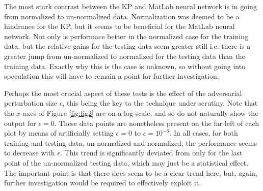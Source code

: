 \documentclass{article} %
\begin{document}
The most stark contrast between the KP and MatLab neural network is in going from normalized to un-normalized data. Normalization was deemed to be a hindrance for the KP, but it seems to be beneficial for the MatLab neural network. Not only is performace better in the normalized case for the training data, but the relative gains for the testing data seem greater still i.e. there is a greater jump from un-normalized to normalized for the testing data than the training data. Exactly why this is the case is unknown, so without going into speculation this will have to remain a point for further investigation.

Perhaps the most crucial aspect of these tests is the effect of the adversarial perturbation size $\epsilon$, this being the key to the technique under scrutiny. Note that the $x$-axes of Figure \ref{fig:fig2} are on a log-scale, and so do not naturally show the output for $\epsilon=0$. These data points are nonetheless present on the far left of each plot by means of artificially setting $\epsilon=0$ to $\epsilon=10^{-6}$. In all cases, for both training and testing data, un-normalized and normalized, the performance seems to decrease with $\epsilon$. This trend is significantly deviated from only for the last point of the un-normalized testing data, which may just be a statistical effect. The important point is that there does seem to be a clear trend here, but, again, further investigation would be required to effectively exploit it.
\end{document}
